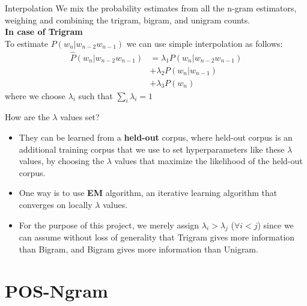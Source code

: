 \documentclass{beamer}
\begin{document}
\begin{frame}{Interpolation}
We mix the probability estimates from all the n-gram estimators, weighing and combining the trigram, bigram, and unigram counts.\\
    \textbf{In case of Trigram}\\
    To estimate $P(w_n|w_{n-2}w_{n-1})$ we can use simple interpolation as follows:
    \begin{align*}
        \hat{P} (w_n|w_{n-2}w_{n-1}) &= \lambda_1P(w_n|w_{n-2}w_{n-1})\\
                                     &+ \lambda_2P(w_n|w_{n-1})\\
                                     &+ \lambda_3P(w_n)
    \end{align*}
    where we choose $\lambda_i$ such that $\sum_i\lambda_i = 1$
\end{frame}

\begin{frame}{How are the $\lambda$ values set?}
    \begin{itemize}
        \item They can be learned from a \textbf{held-out} corpus, where held-out corpus is an additional training corpus that we use to set hyperparameters like these $\lambda$ values, by choosing the $\lambda$ values that maximize the likelihood of the held-out corpus.\\
        \item One way is to use \textbf{EM} algorithm, an iterative learning algorithm that converges on locally $\lambda$ values.
        \item For the purpose of this project, we merely assign $\lambda_i > \lambda_j$ ($\forall i < j$) since we can assume without loss of generality that Trigram gives more information than Bigram, and Bigram gives more information than Unigram.
    \end{itemize}
\end{frame}

\section{POS-Ngram}
\end{document}
